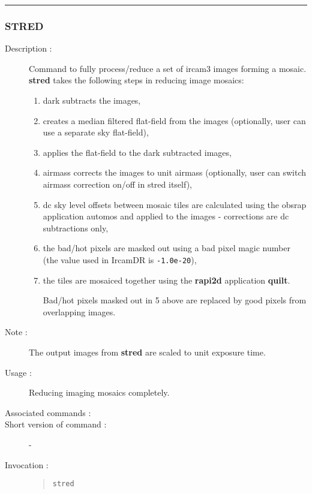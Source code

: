 \hrule
\subsubsection*{\label{STRED}STRED}

\begin{description}

\item[Description :] Command to fully process/reduce a set of {\sc
ircam3} images forming a mosaic. {\bf stred} takes the following steps in
reducing image mosaics:

\begin{enumerate}

\item dark subtracts the images,

\item creates a median filtered flat-field from the images (optionally,
user can use a separate sky flat-field),

\item applies the flat-field to the dark subtracted images,

\item airmass corrects the images to unit airmass
(optionally, user can switch airmass correction on/off in stred itself),


\item dc sky level offsets between mosaic tiles are calculated using
the obsrap application automos and applied to the images - corrections
are dc subtractions only,

\item the bad/hot pixels are masked out using a bad pixel magic number
(the value used in {\sc IrcamDR} is {\tt -1.0e-20}),

\item the tiles are mosaiced together using the {\bf rapi2d}
application {\bf quilt}.

Bad/hot pixels masked out in 5 above are replaced
by good pixels from overlapping images.

\end{enumerate}

\item[Note :] The output images from {\bf stred} are scaled to unit
exposure time.
\item[Usage :] Reducing imaging mosaics completely.
\item[Associated commands :] {\tt {}}
\item[Short version of command :] -
\item[Invocation :]

\begin{quote}{\tt  stred }\end{quote}

\end{description}

